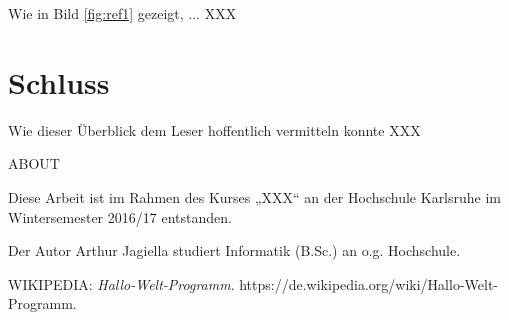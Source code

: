 \documentclass[
a4paper,   %
11pt,      %
oneside,   %
onecolumn, %
final      %
]{article}
\begin{document}
Wie in Bild \ref{fig:ref1} gezeigt, ... XXX

\section{Schluss}
Wie dieser Überblick dem Leser hoffentlich vermitteln konnte XXX



\appendix

\begin{description}
\item{ABOUT}
\begin{description}
\item{Diese Arbeit} ist im Rahmen des Kurses „XXX“ an der Hochschule Karlsruhe im Wintersemester 2016/17 entstanden.

\item{Der Autor} Arthur Jagiella studiert Informatik (B.Sc.) an o.g. Hochschule.
\end{description}
\end{description}

\begin{thebibliography}{99}

  \textsc{WIKIPEDIA}:
  \emph{Hallo-Welt-Programm}.
  https://de.wikipedia.org/wiki/Hallo-Welt-Programm.

\end{thebibliography}
\end{document}

